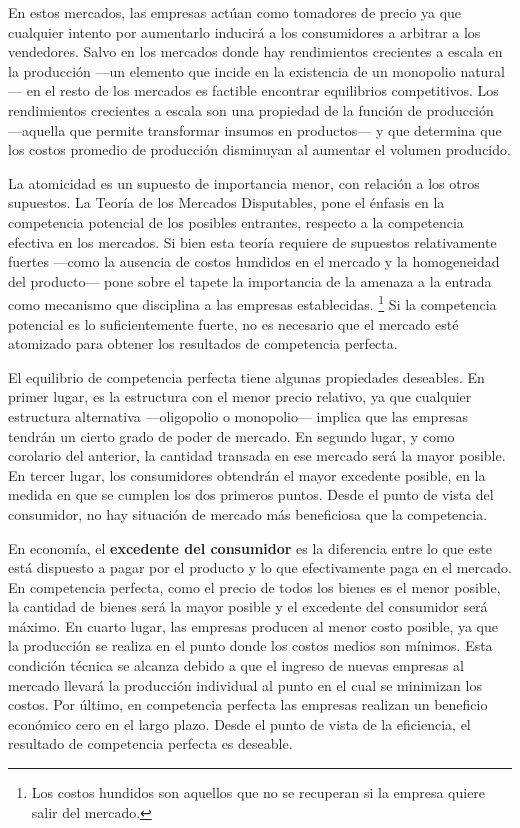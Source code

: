 \documentclass[
  12pt,
  spanish,
]{book}
\begin{document}
En estos mercados, las empresas actúan como tomadores de precio ya que
cualquier intento por aumentarlo inducirá a los consumidores a arbitrar
a los vendedores. Salvo en los mercados donde hay rendimientos
crecientes a escala en la producción ---un elemento que incide en la
existencia de un monopolio natural--- en el resto de los mercados es
factible encontrar equilibrios competitivos. Los rendimientos crecientes
a escala son una propiedad de la función de producción ---aquella que
permite transformar insumos en productos--- y que determina que los
costos promedio de producción disminuyan al aumentar el volumen
producido.

La atomicidad es un supuesto de importancia menor, con relación a los
otros supuestos. La Teoría de los Mercados Disputables, pone el énfasis
en la competencia potencial de los posibles entrantes, respecto a la
competencia efectiva en los mercados. Si bien esta teoría requiere de
supuestos relativamente fuertes ---como la ausencia de costos hundidos
en el mercado y la homogeneidad del producto--- pone sobre el tapete la
importancia de la amenaza a la entrada como mecanismo que disciplina a
las empresas establecidas. \footnote{Los costos hundidos son aquellos
  que no se recuperan si la empresa quiere salir del mercado.} Si la
competencia potencial es lo suficientemente fuerte, no es necesario que
el mercado esté atomizado para obtener los resultados de competencia
perfecta.

El equilibrio de competencia perfecta tiene algunas propiedades
deseables. En primer lugar, es la estructura con el menor precio
relativo, ya que cualquier estructura alternativa ---oligopolio o
monopolio--- implica que las empresas tendrán un cierto grado de poder
de mercado. En segundo lugar, y como corolario del anterior, la cantidad
transada en ese mercado será la mayor posible. En tercer lugar, los
consumidores obtendrán el mayor excedente posible, en la medida en que
se cumplen los dos primeros puntos. Desde el punto de vista del
consumidor, no hay situación de mercado más beneficiosa que la
competencia.

En economía, el \textbf{excedente del consumidor} es la diferencia entre
lo que este está dispuesto a pagar por el producto y lo que
efectivamente paga en el mercado. En competencia perfecta, como el
precio de todos los bienes es el menor posible, la cantidad de bienes
será la mayor posible y el excedente del consumidor será máximo. En
cuarto lugar, las empresas producen al menor costo posible, ya que la
producción se realiza en el punto donde los costos medios son mínimos.
Esta condición técnica se alcanza debido a que el ingreso de nuevas
empresas al mercado llevará la producción individual al punto en el cual
se minimizan los costos. Por último, en competencia perfecta las
empresas realizan un beneficio económico cero en el largo plazo. Desde
el punto de vista de la eficiencia, el resultado de competencia perfecta
es deseable.
\end{document}
